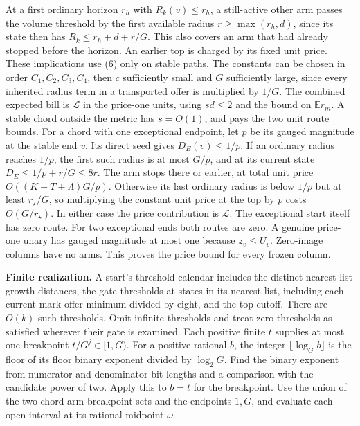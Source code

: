 \documentclass[11pt]{article}
\begin{document}
At a first ordinary horizon \(r_h\) with \(R_k(v)\le r_h\), a still-active other arm passes the volume threshold by the first available radius \(r\ge\max(r_h,d)\), since its state then has \(R_k\le r_h+d+r/G\). This also covers an arm that had already stopped before the horizon. An earlier top is charged by its fixed unit price. These implications use (6) only on stable paths. The constants can be chosen in order \(C_1,C_2,C_3,C_4\), then \(c\) sufficiently small and \(G\) sufficiently large, since every inherited radius term in a transported offer is multiplied by \(1/G\). The combined expected bill is \(\mathcal L\) in the price-one units, using \(sd\le2\) and the bound on \(\mathbb E r_m\). A stable chord outside the metric has \(s=O(1)\), and pays the two unit route bounds. For a chord with one exceptional endpoint, let \(p\) be its gauged magnitude at the stable end \(v\). Its direct seed gives \(D_E(v)\le1/p\). If an ordinary radius reaches \(1/p\), the first such radius is at most \(G/p\), and at its current state \(D_E\le1/p+r/G\le8r\). The arm stops there or earlier, at total unit price \(O((K+T+\Lambda)G/p)\). Otherwise its last ordinary radius is below \(1/p\) but at least \(r_\star/G\), so multiplying the constant unit price at the top by \(p\) costs \(O(G/r_\star)\). In either case the price contribution is \(\mathcal L\). The exceptional start itself has zero route. For two exceptional ends both routes are zero. A genuine price-one unary has gauged magnitude at most one because \(z_v\le U_v\). Zero-image columns have no arms. This proves the price bound for every frozen column.

\textbf{Finite realization.} A start's threshold calendar includes the distinct nearest-list growth distances, the gate thresholds at states in its nearest list, including each current mark offer minimum divided by eight, and the top cutoff. There are \(O(k)\) such thresholds. Omit infinite thresholds and treat zero thresholds as satisfied wherever their gate is examined. Each positive finite \(t\) supplies at most one breakpoint \(t/G^j\in[1,G)\). For a positive rational \(b\), the integer \(\lfloor\log_G b\rfloor\) is the floor of its floor binary exponent divided by \(\log_2 G\). Find the binary exponent from numerator and denominator bit lengths and a comparison with the candidate power of two. Apply this to \(b=t\) for the breakpoint. Use the union of the two chord-arm breakpoint sets and the endpoints \(1,G\), and evaluate each open interval at its rational midpoint \(\omega\).
\end{document}
